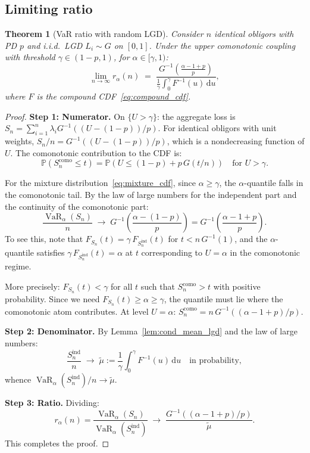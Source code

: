 \documentclass[11pt]{article}
\newtheorem{theorem}{Theorem}[section]
\theoremstyle{definition}
\newcommand{\dd}{\mathrm{d}}
\newcommand{\VaR}{\operatorname{VaR}}
\newcommand{\PP}{\mathbb{P}}
\newcommand{\1}{\mathbf{1}}
\begin{document}
\subsection{Limiting ratio}

\begin{theorem}[VaR ratio with random LGD]\label{thm:lgd_ratio}
Consider $n$ identical obligors with PD $p$ and i.i.d.\ LGD $L_i \sim G$ on $[0,1]$. Under the upper comonotonic coupling with threshold $\gamma \in (1-p, 1)$, for $\alpha \in [\gamma, 1)$:
\begin{equation}\label{eq:lgd_ratio}
  \lim_{n \to \infty} r_\alpha(n) \;=\; \frac{G^{-1}\!\left(\frac{\alpha - 1 + p}{p}\right)}{\frac{1}{\gamma}\int_0^\gamma F^{-1}(u)\,\dd u},
\end{equation}
where $F$ is the compound CDF~\eqref{eq:compound_cdf}.
\end{theorem}

\begin{proof}
\textbf{Step 1: Numerator.} On $\{U > \gamma\}$: the aggregate loss is $S_n = \sum_{i=1}^n \lambda_i G^{-1}((U - (1-p))/p)$. For identical obligors with unit weights, $S_n/n = G^{-1}((U - (1-p))/p)$, which is a nondecreasing function of $U$. The comonotonic contribution to the CDF is:
\[
  \PP(S_n^{\mathrm{como}} \leq t) = \PP\!\left(U \leq (1-p) + p\,G(t/n)\right) \quad\text{for } U > \gamma.
\]

For the mixture distribution~\eqref{eq:mixture_cdf}, since $\alpha \geq \gamma$, the $\alpha$-quantile falls in the comonotonic tail. By the law of large numbers for the independent part and the continuity of the comonotonic part:
\begin{equation}\label{eq:num_lgd}
  \frac{\VaR_\alpha(S_n)}{n} \;\to\; G^{-1}\!\left(\frac{\alpha - (1-p)}{p}\right) = G^{-1}\!\left(\frac{\alpha - 1 + p}{p}\right).
\end{equation}
To see this, note that $F_{S_n}(t) = \gamma\,F_{S_n^{\mathrm{ind}}}(t)$ for $t < n\,G^{-1}(1)$, and the $\alpha$-quantile satisfies $\gamma\,F_{S_n^{\mathrm{ind}}}(t) = \alpha$ at $t$ corresponding to $U = \alpha$ in the comonotonic regime.

More precisely: $F_{S_n}(t) < \gamma$ for all $t$ such that $S_n^{\mathrm{como}} > t$ with positive probability. Since we need $F_{S_n}(t) \geq \alpha \geq \gamma$, the quantile must lie where the comonotonic atom contributes. At level $U = \alpha$: $S_n^{\mathrm{como}} = n\,G^{-1}((\alpha - 1 + p)/p)$.

\textbf{Step 2: Denominator.} By Lemma~\ref{lem:cond_mean_lgd} and the law of large numbers:
\[
  \frac{S_n^{\mathrm{ind}}}{n} \;\to\; \tilde{\mu} := \frac{1}{\gamma}\int_0^\gamma F^{-1}(u)\,\dd u \quad\text{in probability},
\]
whence $\VaR_\alpha(S_n^{\mathrm{ind}})/n \to \tilde{\mu}$.

\textbf{Step 3: Ratio.} Dividing:
\[
  r_\alpha(n) = \frac{\VaR_\alpha(S_n)}{\VaR_\alpha(S_n^{\mathrm{ind}})} \;\to\; \frac{G^{-1}((\alpha - 1 + p)/p)}{\tilde{\mu}}.
\]
This completes the proof.
\end{proof}
\end{document}
